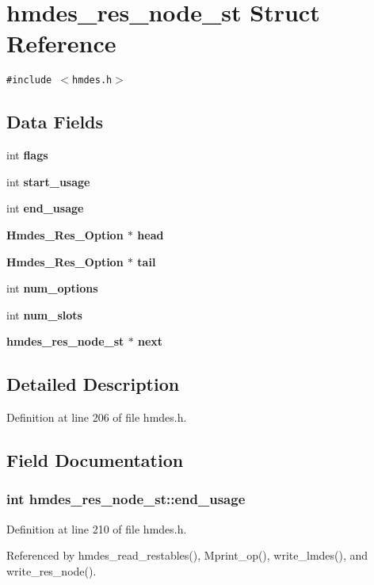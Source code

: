 \section{hmdes\_\-res\_\-node\_\-st Struct Reference}
\label{structhmdes__res__node__st}
{\tt \#include $<$hmdes.h$>$}

\subsection*{Data Fields}
\begin{CompactItemize}
\item 
int \bf{flags}
\item 
int \bf{start\_\-usage}
\item 
int \bf{end\_\-usage}
\item 
\bf{Hmdes\_\-Res\_\-Option} $\ast$ \bf{head}
\item 
\bf{Hmdes\_\-Res\_\-Option} $\ast$ \bf{tail}
\item 
int \bf{num\_\-options}
\item 
int \bf{num\_\-slots}
\item 
\bf{hmdes\_\-res\_\-node\_\-st} $\ast$ \bf{next}
\end{CompactItemize}


\subsection{Detailed Description}




Definition at line 206 of file hmdes.h.

\subsection{Field Documentation}
\subsubsection{\setlength{\rightskip}{0pt plus 5cm}int \bf{hmdes\_\-res\_\-node\_\-st::end\_\-usage}}\label{structhmdes__res__node__st_08ce91bb6a2ca3c1c833ccd224d47baf}




Definition at line 210 of file hmdes.h.

Referenced by hmdes\_\-read\_\-restables(), Mprint\_\-op(), write\_\-lmdes(), and write\_\-res\_\-node().
